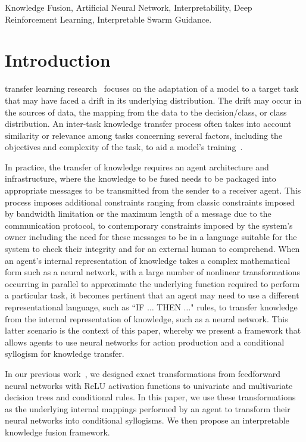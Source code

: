 \documentclass[lettersize,journal]{IEEEtran}
\begin{document}
\begin{IEEEkeywords}
Knowledge Fusion, Artificial Neural Network, Interpretability, Deep Reinforcement Learning, Interpretable Swarm Guidance.
\end{IEEEkeywords}


\section{Introduction}\label{jpaper2-introduction}

 transfer learning research~\cite{pan2009survey,weiss2016survey} focuses on the adaptation of a model to a target task that may have faced a drift in its underlying distribution. The drift may occur in the sources of data, the mapping from the data to the decision/class, or class distribution. An inter-task knowledge transfer process often takes into account similarity or relevance among tasks concerning several factors, including the objectives and complexity of the task, to aid a model\textquoteright s training~\cite{zhang2018overview}.

In practice, the transfer of knowledge requires an agent architecture and infrastructure, where the knowledge to be fused needs to be packaged into appropriate messages to be transmitted from the sender to a receiver agent. This process imposes additional constraints ranging from classic constraints imposed by bandwidth limitation or the maximum length of a message due to the communication protocol, to contemporary constraints imposed by the system\textquoteright s owner including the need for these messages to be in a language suitable for the system to check their integrity and for an external human to comprehend. When an agent\textquoteright s internal representation of knowledge takes a complex mathematical form such as a neural network, with a large number of nonlinear transformations occurring in parallel to approximate the underlying function required to perform a particular task, it becomes pertinent that an agent may need to use a different representational language, such as ``IF $\dots$ THEN $\dots$" rules, to transfer knowledge from the internal representation of knowledge, such as a neural network. This latter scenario is the context of this paper, whereby we present a framework that allows agents to use neural networks for action production and a conditional syllogism for knowledge transfer.

In our previous work~\cite{nguyen2020towards}, we designed exact transformations from feedforward neural networks with ReLU activation functions to univariate and multivariate decision trees and conditional rules. In this paper, we use these transformations as the underlying internal mappings performed by an agent to transform their neural networks into conditional syllogisms. We then propose an interpretable knowledge fusion framework. 
\end{document}

